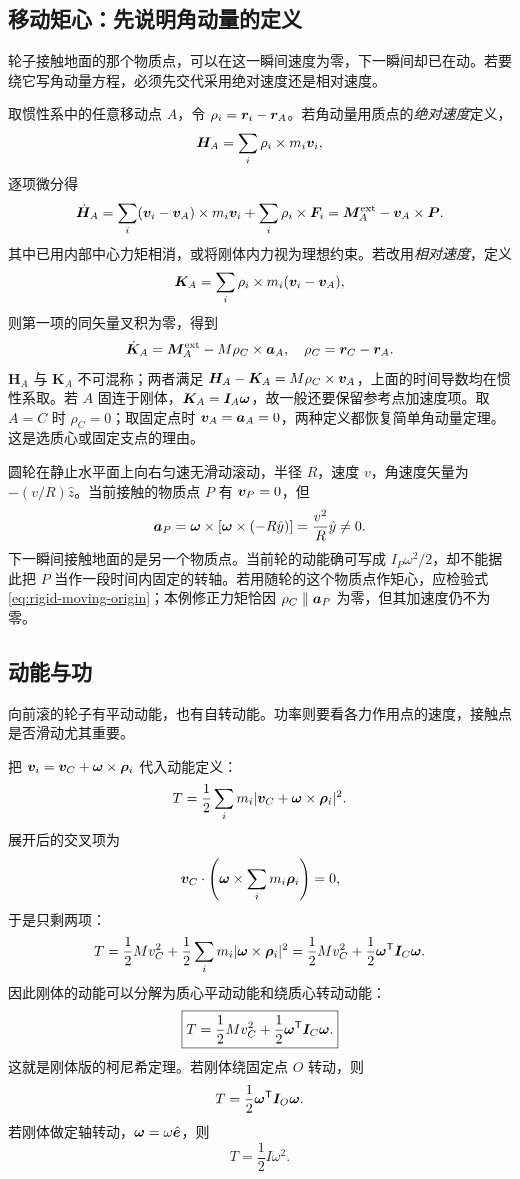 \subsection{移动矩心：先说明角动量的定义}
轮子接触地面的那个物质点，可以在这一瞬间速度为零，下一瞬间却已在动。若要绕它写角动量方程，必须先交代采用绝对速度还是相对速度。

取惯性系中的任意移动点 $A$，令 $\rho_i=\boldsymbol{r}_i-\boldsymbol{r}_A$。若角动量用质点的\emph{绝对速度}定义，
\[
{\boldsymbol H}_A=\sum_i\rho_i\times m_i\boldsymbol{v}_i,
\]
逐项微分得
\[
\dot{\boldsymbol H}_A=\sum_i(\boldsymbol{v}_i-\boldsymbol{v}_A)\times m_i\boldsymbol{v}_i
+\sum_i\rho_i\times\boldsymbol{F}_i
=\boldsymbol{M}_A^{\rm ext}-\boldsymbol{v}_A\times\boldsymbol{P}.
\]
其中已用内部中心力矩相消，或将刚体内力视为理想约束。若改用\emph{相对速度}，定义
\[
{\boldsymbol K}_A=\sum_i\rho_i\times m_i(\boldsymbol{v}_i-\boldsymbol{v}_A),
\]
则第一项的同矢量叉积为零，得到
\begin{equation}
\dot{\boldsymbol K}_A=\boldsymbol{M}_A^{\rm ext}-M\rho_C\times\boldsymbol{a}_A,
\quad \rho_C=\boldsymbol{r}_C-\boldsymbol{r}_A.
\label{eq:rigid-moving-origin}
\end{equation}
${\boldsymbol H}_A$ 与 ${\boldsymbol K}_A$ 不可混称；两者满足 $\boldsymbol H_A-\boldsymbol K_A=M\rho_C\times\boldsymbol{v}_A$，上面的时间导数均在惯性系取。若 $A$ 固连于刚体，${\boldsymbol K}_A=\boldsymbol{I}_A\boldsymbol{\omega}$，故一般还要保留参考点加速度项。取 $A=C$ 时 $\rho_C=0$；取固定点时 $\boldsymbol{v}_A=\boldsymbol{a}_A=0$，两种定义都恢复简单角动量定理。这是选质心或固定支点的理由。

\begin{example}[瞬时静止的接触点不是固定支点]
圆轮在静止水平面上向右匀速无滑动滚动，半径 $R$，速度 $v$，角速度矢量为 $-(v/R)\hat z$。当前接触的物质点 $P$ 有 $\boldsymbol{v}_P=0$，但
\[
\boldsymbol{a}_P=\boldsymbol{\omega}\times[\boldsymbol{\omega}\times(-R\hat y)]
=\frac{v^2}{R}\hat y\ne0.
\]
下一瞬间接触地面的是另一个物质点。当前轮的动能确可写成 $I_P\omega^2/2$，却不能据此把 $P$ 当作一段时间内固定的转轴。若用随轮的这个物质点作矩心，应检验式 \eqref{eq:rigid-moving-origin}；本例修正力矩恰因 $\rho_C\parallel\boldsymbol{a}_P$ 为零，但其加速度仍不为零。
\end{example}


\subsection{动能与功}

向前滚的轮子有平动动能，也有自转动能。功率则要看各力作用点的速度，接触点是否滑动尤其重要。

把 \(\boldsymbol{v}_i=\boldsymbol{v}_C+\boldsymbol{\omega}\times\boldsymbol\rho_i\) 代入动能定义：
\[
T=\frac12\sum_i m_i|\boldsymbol{v}_C+\boldsymbol{\omega}\times\boldsymbol\rho_i|^2.
\]
展开后的交叉项为
\[
\boldsymbol{v}_C\cdot\left(\boldsymbol{\omega}\times\sum_i m_i\boldsymbol\rho_i\right)=0,
\]
于是只剩两项：
\[
T=\frac12Mv_C^2
+\frac12\sum_i m_i|\boldsymbol{\omega}\times\boldsymbol\rho_i|^2
=\frac12Mv_C^2+\frac12\boldsymbol{\omega}^{\mathsf T}\boldsymbol{I}_C\boldsymbol{\omega}.
\]
因此刚体的动能可以分解为质心平动动能和绕质心转动动能：
\begin{equation}
\boxed{
T=\frac12Mv_C^2+\frac12\boldsymbol{\omega}^{\mathsf T}\boldsymbol{I}_C\boldsymbol{\omega}.
}
\label{eq:rigid-kinetic-energy}
\end{equation}
这就是刚体版的柯尼希定理。若刚体绕固定点 \(O\) 转动，则
\begin{equation}
T=\frac12\boldsymbol{\omega}^{\mathsf T}\boldsymbol{I}_O\boldsymbol{\omega}.
\label{eq:rigid-kinetic-energy-fixed}
\end{equation}
若刚体做定轴转动，\(\boldsymbol{\omega}=\omega\hat{\boldsymbol{e}}\)，则
\[
T=\frac12 I\omega^2.
\]

